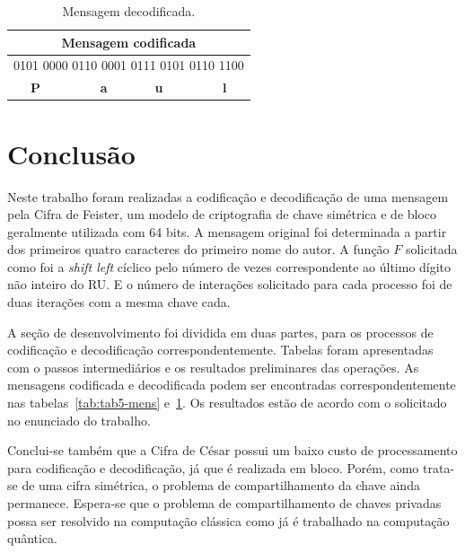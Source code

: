 \documentclass[a4paper,pra,aps,twocolumn,superscriptaddress,10pt,final]{revtex4-2}
\begin{document}
    \begin{table}[!htpb]
        \caption{Mensagem decodificada.}
        \label{tab:tab9-mens-deco}
        \begin{tabular}{|c|}
            \hline
            \textbf{Mensagem codificada}                      \\ \hline
            0101 0000 0110 0001 0111 0101 0110 1100           \\ \hline
            \textbf{P $\qquad \quad \quad$ a $\quad \qquad$ u $\qquad \quad \quad$ l} \\ \hline
        \end{tabular}%
    \end{table}

\section{Conclusão}
\label{sec:conclusion}
    
    Neste trabalho foram realizadas a codificação e decodificação de uma mensagem pela Cifra de Feister, um modelo de criptografia de chave simétrica e de bloco geralmente utilizada com 64 bits. A mensagem original foi determinada a partir dos primeiros quatro caracteres do primeiro nome do autor. A função $F$ solicitada como foi a \textit{shift left} cíclico pelo número de vezes correspondente ao último dígito não inteiro do RU. E o número de interações solicitado para cada processo foi de duas iterações com a mesma chave cada.
    
    A seção de desenvolvimento foi dividida em duas partes, para os processos de codificação e decodificação correspondentemente. Tabelas foram apresentadas com o passos intermediários e os resultados preliminares das operações. As mensagens codificada e decodificada podem ser encontradas correspondentemente nas tabelas~\ref{tab:tab5-mens} e~\ref{tab:tab9-mens-deco}. Os resultados estão de acordo com o solicitado no enunciado do trabalho.

    Conclui-se também que a Cifra de César possui um baixo custo de processamento para codificação e decodificação, já que é realizada em bloco. Porém, como trata-se de uma cifra simétrica, o problema de  compartilhamento da chave ainda permanece. Espera-se que o problema de compartilhamento de chaves privadas possa ser resolvido na computação clássica como já é trabalhado na computação quântica.

    \vspace{-0.5cm}
\end{document}
